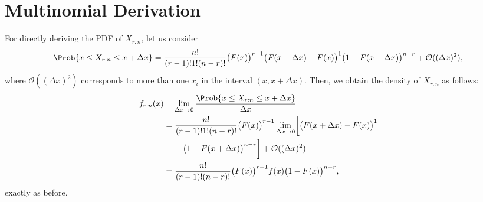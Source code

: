 \section*{Multinomial Derivation}
For directly deriving the PDF of $ X_{r:n} $, let us consider
\[ \Prob{x\le X_{r:n}\le x+\Delta x}=
    \frac{n!}{(r-1)!1!(n-r)!}\bigl(F(x)\bigr)^{r-1}\bigl(F(x+\Delta x)-F(x)\bigr)^{1}\bigl(1-F(x+\Delta x)\bigr)^{n-r}
    +\mathcal{O}((\Delta x)^2), \]
where $ \mathcal{O}((\Delta x)^2) $ corresponds to more than
one $ x_i $ in the interval $ (x,x+\Delta x) $.
Then, we obtain the density of $ X_{r:n} $ as follows:
\begin{align*}
    f_{r:n}(x)
     & =\lim\limits_{{\Delta x} \to {0}}\frac{\Prob{x\le X_{r:n}\le x+\Delta x}}{\Delta x}                                       \\
     & =\frac{n!}{(r-1)!1!(n-r)!}\bigl(F(x)\bigr)^{r-1}\lim\limits_{{\Delta x} \to {0}}\biggl[\bigl(F(x+\Delta x)-F(x)\bigr)^{1} \\
     & \phantom{{}={}}\quad \bigl(1-F(x+\Delta x)\bigr)^{n-r}\biggr] +\mathcal{O}((\Delta x)^2)                                  \\
     & =\frac{n!}{(r-1)!(n-r)!}\bigl(F(x)\bigr)^{r-1}f(x)\bigl(1-F(x)\bigr)^{n-r},
\end{align*}
exactly as before.

